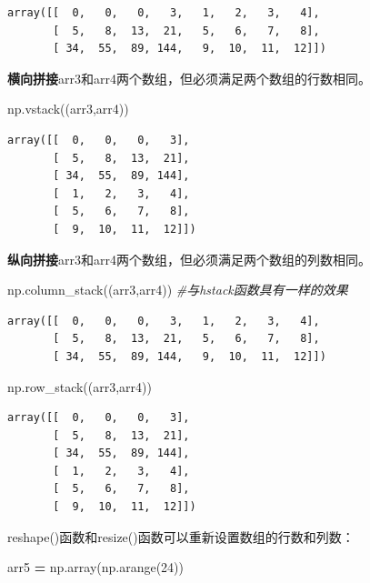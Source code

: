 \documentclass[]{article}
\newenvironment{Shaded}{\begin{snugshade}}{\end{snugshade}}
\newcommand{\DecValTok}[1]{\textcolor[rgb]{0.00,0.00,0.81}{#1}}
\newcommand{\CommentTok}[1]{\textcolor[rgb]{0.56,0.35,0.01}{\textit{#1}}}
\newcommand{\OperatorTok}[1]{\textcolor[rgb]{0.81,0.36,0.00}{\textbf{#1}}}
\newcommand{\NormalTok}[1]{#1}
\begin{document}
\begin{verbatim}
array([[  0,   0,   0,   3,   1,   2,   3,   4],
       [  5,   8,  13,  21,   5,   6,   7,   8],
       [ 34,  55,  89, 144,   9,  10,  11,  12]])
\end{verbatim}

\textbf{横向拼接}arr3和arr4两个数组，但必须满足两个数组的行数相同。

\begin{Shaded}
\begin{Highlighting}[]
\NormalTok{np.vstack((arr3,arr4))}
\end{Highlighting}
\end{Shaded}

\begin{verbatim}
array([[  0,   0,   0,   3],
       [  5,   8,  13,  21],
       [ 34,  55,  89, 144],
       [  1,   2,   3,   4],
       [  5,   6,   7,   8],
       [  9,  10,  11,  12]])
\end{verbatim}

\textbf{纵向拼接}arr3和arr4两个数组，但必须满足两个数组的列数相同。

\begin{Shaded}
\begin{Highlighting}[]
\NormalTok{np.column_stack((arr3,arr4))    }\CommentTok{#与hstack函数具有一样的效果}
\end{Highlighting}
\end{Shaded}

\begin{verbatim}
array([[  0,   0,   0,   3,   1,   2,   3,   4],
       [  5,   8,  13,  21,   5,   6,   7,   8],
       [ 34,  55,  89, 144,   9,  10,  11,  12]])
\end{verbatim}

\begin{Shaded}
\begin{Highlighting}[]
\NormalTok{np.row_stack((arr3,arr4))}
\end{Highlighting}
\end{Shaded}

\begin{verbatim}
array([[  0,   0,   0,   3],
       [  5,   8,  13,  21],
       [ 34,  55,  89, 144],
       [  1,   2,   3,   4],
       [  5,   6,   7,   8],
       [  9,  10,  11,  12]])
\end{verbatim}

reshape()函数和resize()函数可以重新设置数组的行数和列数：

\begin{Shaded}
\begin{Highlighting}[]
\NormalTok{arr5 }\OperatorTok{=}\NormalTok{ np.array(np.arange(}\DecValTok{24}\NormalTok{))}
\end{Highlighting}
\end{Shaded}
\end{document}

